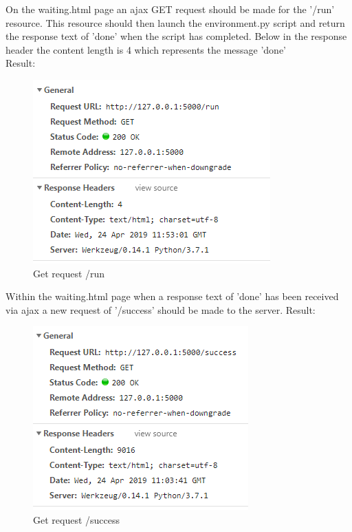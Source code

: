 \begin{enumerate}
	On the waiting.html page an ajax GET request should be made for the '/run' resource. This resource should then launch the environment.py script and return the response text of 'done' when the script has completed. Below in the response header the content length is 4 which represents the message 'done'\\
	Result:
	\begin{figure}[H]
		\centering
		\includegraphics[width=0.7\linewidth]{"img/Run GET"}
		\caption{Get request /run}
		\label{fig:run-get}
	\end{figure}
	
	Within the waiting.html page when a response text of 'done' has been received via ajax a new request of '/success' should be made to the server.
	Result:
	\begin{figure}[h]
		\centering
		\includegraphics[width=0.7\linewidth]{img/SuccessResource}
		\caption{Get request /success}
		\label{fig:successresource}
	\end{figure}
	

\end{enumerate}

